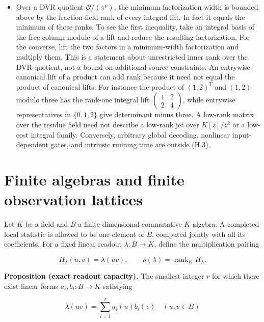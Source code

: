 \documentclass[
  11pt,
]{article}
\begin{document}
\begin{itemize}
  \(\prod_t(T-t)^{k_t}\) and zero give the same jets and different
  anchor values. A promise on a smaller polynomial family can change
  this necessity.
\item
  Over a DVR quotient \(\mathcal O/(\pi^p)\), the minimum
  factorization width is bounded above by the fraction-field rank of
  every integral lift. In fact it equals the minimum of those ranks.
  To see the first inequality, take an integral basis of the free
  column module of a lift and reduce the resulting factorization.
  For the converse, lift the two factors in a minimum-width
  factorization and multiply them. This is a statement about
  unrestricted inner rank over the DVR quotient, not a bound on
  additional source constraints. An entrywise canonical lift of a
  product can add rank because it need not equal the product of
  canonical lifts. For instance the product of \((1,2)^T\) and \((1,2)\)
  modulo three has the rank-one integral lift
  \(\left(\begin{smallmatrix}1&2\\2&4\end{smallmatrix}\right)\), while
  entrywise representatives in \(\{0,1,2\}\) give determinant minus
  three. A low-rank matrix over the residue field need not describe a
  low-rank jet over \(K[z]/z^k\) or a low-cost integral family.
  Conversely, arbitrary global decoding, nonlinear input-dependent
  gates, and intrinsic running time are outside (H.3).
\end{itemize}

\section{Finite algebras and finite observation
lattices}\label{finite-algebras-and-finite-observation-lattices}

Let \(K\) be a field and \(B\) a finite-dimensional commutative
\(K\)-algebra. A completed local statistic is allowed to be one element
of \(B\), computed jointly with all its coefficients. For a fixed linear
readout \(\lambda:B\to K\), define the multiplication pairing

\[H_\lambda(u,v)=\lambda(uv),\qquad \rho(\lambda)=\operatorname{rank}_K H_\lambda.\]

\textbf{Proposition (exact readout capacity).} The smallest integer
\(r\) for which there exist linear forms \(a_i,b_i:B\to K\) satisfying

\[\lambda(uv)=\sum_{i=1}^r a_i(u)b_i(v)\quad(u,v\in B)\]
\end{document}
